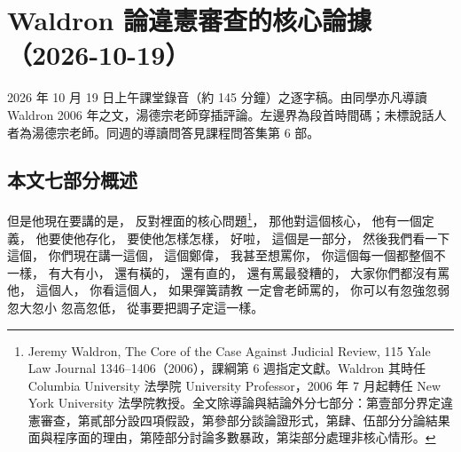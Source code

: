 \chapter{Waldron 論違憲審查的核心論據（2026-10-19）}

2026 年 10 月 19 日上午課堂錄音（約 145 分鐘）之逐字稿。由同學亦凡導讀 Waldron 2006 年之文，湯德宗老師穿插評論。左邊界為段首時間碼；未標說話人者為湯德宗老師。同週的導讀問答見課程問答集第 6 部。


\section{本文七部分概述}

\hypertarget{w06:cue:1}{}但是他現在要講的是，
\hypertarget{w06:cue:2}{}反對裡面的核心問題\footnote{Jeremy Waldron, The Core of the Case Against Judicial Review, 115 Yale Law Journal 1346–1406（2006），課綱第 6 週指定文獻。Waldron 其時任 Columbia University 法學院 University Professor，2006 年 7 月起轉任 New York University 法學院教授。全文除導論與結論外分七部分：第壹部分界定違憲審查，第貳部分設四項假設，第參部分談論證形式，第肆、伍部分分論結果面與程序面的理由，第陸部分討論多數暴政，第柒部分處理非核心情形。}，
\hypertarget{w06:cue:3}{}那他對這個核心，
\hypertarget{w06:cue:4}{}他有一個定義，
\hypertarget{w06:cue:5}{}他要使他存化，
\hypertarget{w06:cue:6}{}要使他怎樣怎樣，
\hypertarget{w06:cue:7}{}好啦，
\hypertarget{w06:cue:8}{}這個是一部分，
\hypertarget{w06:cue:9}{}然後我們看一下這個，
\hypertarget{w06:cue:10}{}你們現在講一這個，
\hypertarget{w06:cue:11}{}這個鄭偉，
\hypertarget{w06:cue:12}{}我甚至想罵你，
\hypertarget{w06:cue:13}{}你這個每一個都整個不一樣，
\hypertarget{w06:cue:14}{}有大有小，
\hypertarget{w06:cue:15}{}還有橫的，
\hypertarget{w06:cue:16}{}還有直的，
\hypertarget{w06:cue:17}{}還有罵最發糟的，
\hypertarget{w06:cue:18}{}大家你們都沒有罵他，
\hypertarget{w06:cue:19}{}這個人，
\hypertarget{w06:cue:20}{}你看這個人，
\hypertarget{w06:cue:21}{}如果彈簧請教 一定會老師罵的，
\hypertarget{w06:cue:22}{}你可以有忽強忽弱 忽大忽小 忽高忽低，
\hypertarget{w06:cue:23}{}從事要把調子定這一樣。

